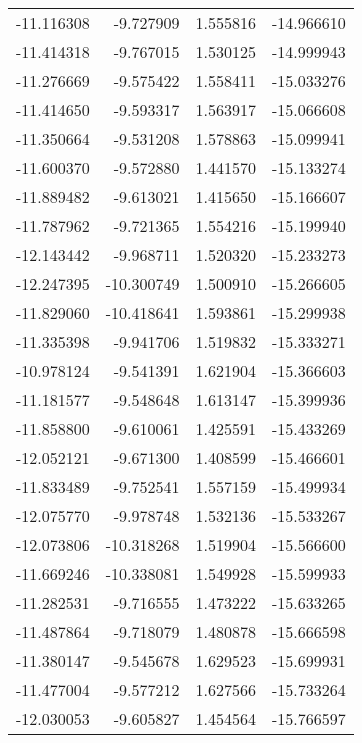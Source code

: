 \begin{tabular}{rrrr}
      -11.116308 &        -9.727909 &    1.555816 & -14.966610 \\
      -11.414318 &        -9.767015 &    1.530125 & -14.999943 \\
      -11.276669 &        -9.575422 &    1.558411 & -15.033276 \\
      -11.414650 &        -9.593317 &    1.563917 & -15.066608 \\
      -11.350664 &        -9.531208 &    1.578863 & -15.099941 \\
      -11.600370 &        -9.572880 &    1.441570 & -15.133274 \\
      -11.889482 &        -9.613021 &    1.415650 & -15.166607 \\
      -11.787962 &        -9.721365 &    1.554216 & -15.199940 \\
      -12.143442 &        -9.968711 &    1.520320 & -15.233273 \\
      -12.247395 &       -10.300749 &    1.500910 & -15.266605 \\
      -11.829060 &       -10.418641 &    1.593861 & -15.299938 \\
      -11.335398 &        -9.941706 &    1.519832 & -15.333271 \\
      -10.978124 &        -9.541391 &    1.621904 & -15.366603 \\
      -11.181577 &        -9.548648 &    1.613147 & -15.399936 \\
      -11.858800 &        -9.610061 &    1.425591 & -15.433269 \\
      -12.052121 &        -9.671300 &    1.408599 & -15.466601 \\
      -11.833489 &        -9.752541 &    1.557159 & -15.499934 \\
      -12.075770 &        -9.978748 &    1.532136 & -15.533267 \\
      -12.073806 &       -10.318268 &    1.519904 & -15.566600 \\
      -11.669246 &       -10.338081 &    1.549928 & -15.599933 \\
      -11.282531 &        -9.716555 &    1.473222 & -15.633265 \\
      -11.487864 &        -9.718079 &    1.480878 & -15.666598 \\
      -11.380147 &        -9.545678 &    1.629523 & -15.699931 \\
      -11.477004 &        -9.577212 &    1.627566 & -15.733264 \\
      -12.030053 &        -9.605827 &    1.454564 & -15.766597 \\

\end{tabular}

